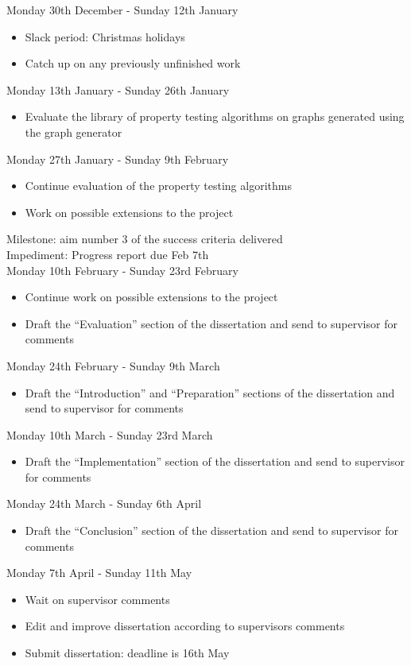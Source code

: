 \documentclass[11pt,a4paper]{article}
\begin{document}
Monday 30th December - Sunday 12th January
\begin{itemize}
    \item Slack period: Christmas holidays
    \item Catch up on any previously unfinished work
\end{itemize}
Monday 13th January - Sunday 26th January
\begin{itemize}
    \item Evaluate the library of property testing algorithms on graphs generated using the graph generator
\end{itemize}
Monday 27th January - Sunday 9th February
\begin{itemize}
    \item Continue evaluation of the property testing algorithms
    \item Work on possible extensions to the project
\end{itemize}
Milestone: aim number 3 of the success criteria delivered \\
Impediment: Progress report due Feb 7th \\
Monday 10th February - Sunday 23rd February
\begin{itemize}
    \item Continue work on possible extensions to the project
    \item Draft the “Evaluation” section of the dissertation and send to supervisor for comments
\end{itemize}
Monday 24th February - Sunday 9th March
\begin{itemize}
    \item Draft the “Introduction” and “Preparation” sections of the dissertation and send to supervisor for comments
\end{itemize}
Monday 10th March - Sunday 23rd March
\begin{itemize}
    \item Draft the “Implementation” section of the dissertation and send to supervisor for comments
\end{itemize}
Monday 24th March - Sunday 6th April
\begin{itemize}
    \item Draft the “Conclusion” section of the dissertation and send to supervisor for comments
\end{itemize}
Monday 7th April - Sunday 11th May
\begin{itemize}
    \item Wait on supervisor comments
    \item Edit and improve dissertation according to supervisors comments
    \item Submit dissertation: deadline is 16th May
\end{itemize}
\end{document}
